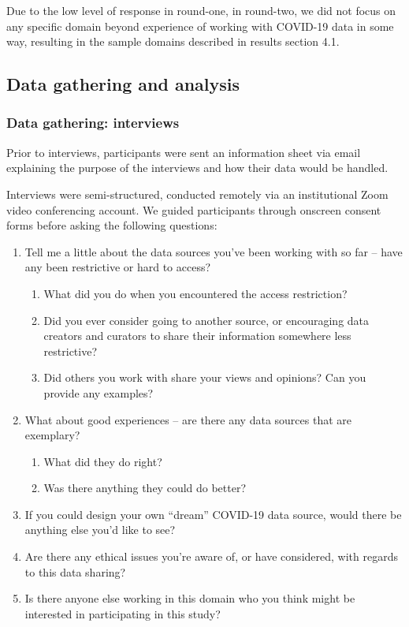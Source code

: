 \documentclass{CUP-JNL-DAP}%
\begin{document}
Due to the low level of response in round-one, in round-two, we did not focus on any specific domain beyond experience of working with COVID-19 data in some way, resulting in the sample domains described in results section 4.1.

\subsection{Data gathering and analysis}

\subsubsection{Data gathering: interviews}
Prior to interviews, participants were sent an information sheet via email explaining the purpose of the interviews and how their data would be handled. 

Interviews were semi-structured, conducted remotely via an institutional Zoom \cite{zoom_2022} video conferencing account. We guided participants through onscreen consent forms before asking the following questions: 

\begin{enumerate}
\item Tell me a little about the data sources you've been working with so far – have any been restrictive or hard to access?
\begin{enumerate}
\item What did you do when you encountered the access restriction?
\item Did you ever consider going to another source, or encouraging data creators and curators to share their information somewhere less restrictive?
\item Did others you work with share your views and opinions? Can you provide any examples?
\end{enumerate}
\item What about good experiences – are there any data sources that are exemplary? 
\begin{enumerate}
\item What did they do right?
\item Was there anything they could do better?
\end{enumerate}
\item If you could design your own “dream” COVID-19 data source, would there be anything
else you’d like to see?
\item Are there any ethical issues you’re aware of, or have considered, with regards to this
data sharing?
\item Is there anyone else working in this domain who you think might be interested in
participating in this study?
\end{enumerate}
\end{document}
